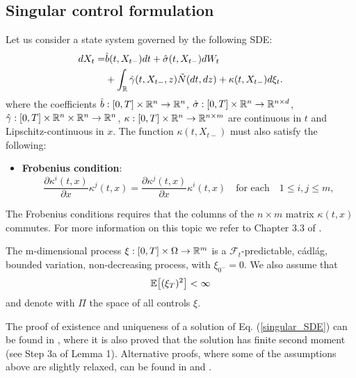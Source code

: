 \subsection{Singular control formulation}\label{singular_sec2}

Let us consider a state system governed by the following SDE:
\begin{align}\label{singular_SDE}
 dX_t =& \hat b(t,X_{t-}) dt + \hat \sigma (t,X_{t-}) dW_t \\ \nonumber
      &+ \int_{\mathbb{R}} \hat \gamma(t,X_{t-},z) \tilde N(dt,dz) + \kappa(t,X_{t-}) d\xi_t .
\end{align} 
where the coefficients 
$\hat b: [0,T]\times \mathbb{R}^n \to \mathbb{R}^n$, $\hat \sigma: [0,T]\times \mathbb{R}^n \to \mathbb{R}^{n \times d}$, 
$\hat \gamma: [0,T]\times \mathbb{R}^n \times \mathbb{R}^n \to \mathbb{R}^{n}$, $\kappa : [0,T] \times \mathbb{R}^n \to \mathbb{R}^{n \times m}$
are continuous in $t$ and Lipschitz-continuous in $x$.
The function $\kappa(t,X_{t-})$ must also satisfy the following:
\begin{itemize}
 \item \textbf{Frobenius condition}:
 \begin{equation}\label{Frobenius}
  \frac{\partial \kappa^i(t,x)}{\partial x} \kappa^j(t,x) = \frac{\partial \kappa^j(t,x)}{\partial x} \kappa^i(t,x) \quad \mbox{for each} \quad 1 \leq i, j \leq m,
 \end{equation}
\end{itemize}
The Frobenius conditions requires that the columns of the $n\times m$ matrix $\kappa(t,x)$ commutes. For more information on this topic we refer to Chapter 3.3 of \cite{Arutyunov}.  

The m-dimensional process $\xi : [0,T] \times \Omega \to \mathbb{R}^m$ is a $\mathcal{F}_t$-predictable, cádlág, bounded variation, 
non-decreasing process, with $\xi_{0^-} = 0$. 
We also assume that 
\begin{equation}\label{singular_moments}
\mathbb{E}\bigl[ (\xi_T)^2 \bigr] < \infty  
\end{equation}
and denote with $\Pi$ the space of all controls $\xi$.

The proof of existence and uniqueness of a solution 
of Eq. (\ref{singular_SDE}) can be found in \cite{DoDa76}, where it is also proved that the solution has finite second moment  
(see Step 3a of Lemma 1). 
Alternative proofs, where some of the assumptions above are slightly relaxed, can be found in \cite{Gal78} and \cite{GyKr80}.  

